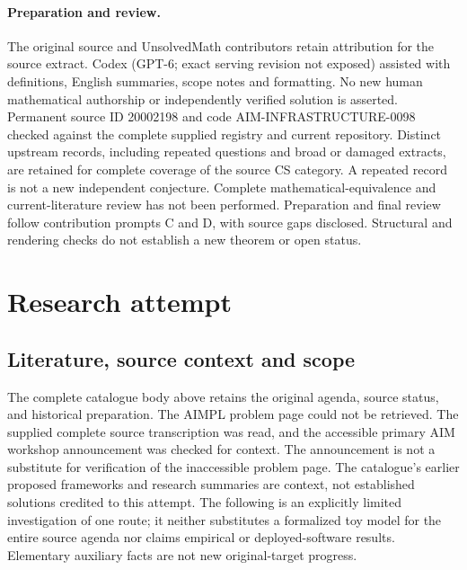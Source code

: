\documentclass[11pt]{article}
\begin{document}
\paragraph{Preparation and review.}
The original source and UnsolvedMath contributors retain attribution for the source extract. Codex (GPT-6; exact serving revision not exposed) assisted with definitions, English summaries, scope notes and formatting. No new human mathematical authorship or independently verified solution is asserted. Permanent source ID 20002198 and code AIM-INFRASTRUCTURE-0098 checked against the complete supplied registry and current repository. Distinct upstream records, including repeated questions and broad or damaged extracts, are retained for complete coverage of the source CS category. A repeated record is not a new independent conjecture. Complete mathematical-equivalence and current-literature review has not been performed. Preparation and final review follow contribution prompts C and D, with source gaps disclosed. Structural and rendering checks do not establish a new theorem or open status.
\label{end:20002198}

\section{Research attempt}
\subsection{Literature, source context and scope}
The complete catalogue body above retains the original agenda, source status, and historical preparation. The AIMPL problem page could not be retrieved. The supplied complete source transcription was read, and the accessible primary AIM workshop announcement was checked for context. The announcement is not a substitute for verification of the inaccessible problem page. The catalogue's earlier proposed frameworks and research summaries are context, not established solutions credited to this attempt. The following is an explicitly limited investigation of one route; it neither substitutes a formalized toy model for the entire source agenda nor claims empirical or deployed-software results. Elementary auxiliary facts are not new original-target progress.
\end{document}
